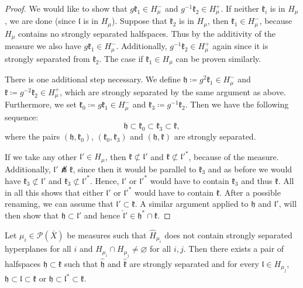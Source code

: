 \begin{proof}
  We would like to show that \(g\mathfrak{k}_1 \in H_\mu^-\) and \(g^{-1}\mathfrak{k}_2 \in H_\mu^+\). If neither \(\mathfrak{k}_i\) is in \(H_\mu\), we are done (since \(\mathfrak{l}\) is in \(H_\mu\)). Suppose that \(\mathfrak{k}_2\) is in \(H_\mu\), then \(\mathfrak{k}_1 \in H_\mu^-\), because \(H_\mu\) contains no strongly separated halfspaces. Thus by the additivity of the measure we also have \(g\mathfrak{k}_1 \in H_\mu^-\). Additionally, \(g^{-1}\mathfrak{k}_2 \in H_\mu^+\) again since it is strongly separated from \(\mathfrak{k}_2\). The case if \(\mathfrak{k}_1 \in H_\mu\) can be proven similarly.

  There is one additional step necessary. We define \(\mathfrak{h} \coloneqq g^2\mathfrak{k}_1 \in H_\mu^-\) and \(\mathfrak{k} \coloneqq g^{-2}\mathfrak{k}_2 \in H_\mu^+\), which are strongly separated by the same argument as above. Furthermore, we set \(\mathfrak{k_0} \coloneqq g\mathfrak{k}_1 \in H_\mu^-\) and \(\mathfrak{k}_3 \coloneqq g^{-1}\mathfrak{k}_2\). Then we have the following sequence:
  \[
    \mathfrak{h} \subset \mathfrak{k}_0 \subset \mathfrak{k}_3 \subset \mathfrak{k},
  \]
  where the pairs \((\mathfrak{h}, \mathfrak{k}_0)\), \((\mathfrak{k_0}, \mathfrak{k}_3)\) and \((\mathfrak{h}, \mathfrak{k})\) are strongly separated. 

  If we take any other \(\mathfrak{l}' \in H_\mu\), then \(\mathfrak{k} \not\subset \mathfrak{l}'\) and \(\mathfrak{k} \not \subset \mathfrak{l}'^\ast\), because of the measure. Additionally, \(\mathfrak{l}' \not\pitchfork \mathfrak{k}\), since then it would be parallel to \(\mathfrak{k}_3\) and as before we would have \(\mathfrak{k}_3 \not\subset \mathfrak{l}'\) and \(\mathfrak{k}_3 \not\subset \mathfrak{l}'^\ast\). Hence, \(\mathfrak{l}'\) or \(\mathfrak{l}'^\ast\) would have to contain \(\mathfrak{k}_3\) and thus \(\mathfrak{k}\). All in all this shows that either \(\mathfrak{l}'\) or \(\mathfrak{l}'^\ast\) would have to contain \(\mathfrak{k}\). After a possible renaming, we can assume that \(\mathfrak{l}' \subset \mathfrak{k}\). A similar argument applied to \(\mathfrak{h}\) and \(\mathfrak{l}'\), will then show that \(\mathfrak{h} \subset \mathfrak{l}'\) and hence \(\mathfrak{\hat l}' \in \mathfrak{h}^\ast \cap \mathfrak{k}\).
\end{proof}

\begin{lemma}[{\cite[Lemma~4.20]{MR3509968}}]
  \label{lem:4.20}
  Let \(\mu_i \in \mathcal{P}(\bar X)\) be measures such that \(\hat H_{\mu_i}\) does not contain strongly separated hyperplanes for all \(i\) and \(H_{\mu_i} \cap H_{\mu_j} \neq \varnothing\) for all \(i,j\). Then there exists a pair of halfspaces \(\mathfrak{h} \subset \mathfrak{k}\) such that \(\mathfrak{\hat h}\) and \(\mathfrak{\hat k}\) are strongly separated and for every \(\mathfrak{l} \in H_{\mu_j}\), \(\mathfrak{h} \subset \mathfrak{l} \subset \mathfrak{k}\) or \(\mathfrak{h} \subset \mathfrak{l}^\ast \subset \mathfrak{k}\).
\end{lemma}

